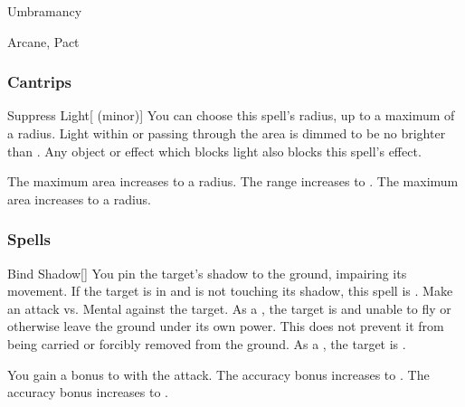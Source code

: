 \newpage
\begin{spellsection}{Umbramancy}

\begin{spellheader}
\end{spellheader}


 Arcane, Pact

\subsubsection{Cantrips}


\begin{freeability}{Suppress Light}[ (minor)]
You can choose this spell's radius, up to a maximum of a \areamed radius.
Light within or passing through the area is dimmed to be no brighter than .
Any object or effect which blocks light also blocks this spell's effect.

\rankline
{} The maximum area increases to a \arealarge radius.
 The range increases to \rnglong.
 The maximum area increases to a \areaext radius.
\end{freeability}

\end{spellsection}


\subsubsection{Spells}


\lowercase{\hypertarget{spell:Bind Shadow}{}}\label{spell:Bind Shadow}
\begin{freeability}[Rank 1]{\hypertarget{spell:Bind Shadow}{Bind Shadow}}[]
You pin the target's shadow to the ground, impairing its movement.
If the target is in  and is not touching its shadow, this spell is .
Make an attack vs. Mental against the target.
\hit As a , the target is  and unable to fly or otherwise leave the ground under its own power.
This does not prevent it from being carried or forcibly removed from the ground.
\crit As a , the target is .

\rankline
{} You gain a  bonus to  with the attack.
 The accuracy bonus increases to .
 The accuracy bonus increases to .

\end{freeability}
\vspace{0.25em}



